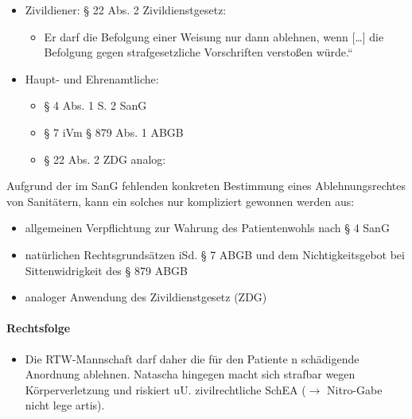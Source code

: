 \begin{itemize}
	\item {\mdseries
	Zivildiener: {\S} 22 Abs. 2 Zivildienstgesetz:}


	\begin{itemize}
		\item
		{\quotedblbase}Er darf die Befolgung einer Weisung nur dann ablehnen,
		wenn [{\dots}] die Befolgung gegen strafgesetzliche Vorschriften
		versto{\ss}en w\"urde.{\textquotedblleft}

	\end{itemize}

	\item {\mdseries
	Haupt- und Ehrenamtliche: }

	\begin{itemize}
		\item {\mdseries
		{\S} 4 Abs. 1 S. 2 SanG}

		\item {\mdseries
		{\S} 7 iVm {\S} 879 Abs. 1 ABGB}

		\item {\mdseries
		{\S} 22 Abs. 2 ZDG analog:}

	\end{itemize}

\end{itemize}

Aufgrund der im SanG fehlenden konkreten Bestimmung eines
Ablehnungsrechtes von Sanitätern, kann ein solches nur kompliziert
gewonnen werden aus:

\begin{itemize}
	\item {\mdseries
	allgemeinen Verpflichtung zur Wahrung des Patientenwohls nach {\S} 4
	SanG}

	\item {\mdseries
	nat\"urlichen Rechtsgrundsätzen iSd. {\S} 7 ABGB und dem
	Nichtigkeitsgebot bei Sittenwidrigkeit des {\S} 879 ABGB}

	\item {\mdseries
	analoger Anwendung des Zivildienstgesetz (ZDG) }

\end{itemize}

\paragraph*{Rechtsfolge}

\begin{itemize}
	\item {\mdseries\color[rgb]{0.0,0.0,0.5019608}
	Die RTW-Mannschaft darf daher die f\"ur den Patiente
n	schädigende Anordnung ablehnen. Natascha hingegen macht
	sich strafbar wegen K\"orperverletzung und riskiert uU. zivilrechtliche SchEA
	(${\rightarrow}$ Nitro-Gabe nicht lege artis).}

\end{itemize}

